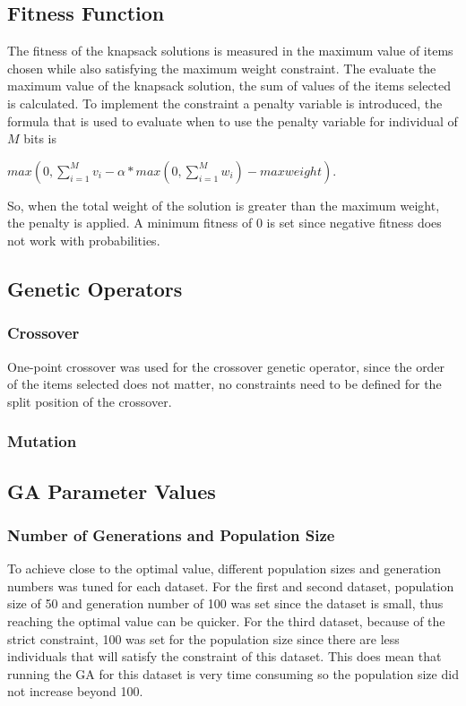 \documentclass{article}
\begin{document}
\subsection*{Fitness Function}
The fitness of the knapsack solutions is measured in the maximum value of items chosen while also satisfying the maximum weight constraint. The evaluate the maximum value of the knapsack solution, the sum of values of the items selected is calculated. To implement the constraint a penalty variable is introduced, the formula that is used to evaluate when to use the penalty variable for individual of $M$ bits is 
\begin{center} 
$max(0, \sum_{i=1}^{M}v_i - \alpha *max(0,\sum_{i=1}^{M}w_i)-max weight)$. 
\end{center}
So, when the total weight of the solution is greater than the maximum weight, the penalty is applied. A minimum fitness of 0 is set since negative fitness does not work with probabilities.
\subsection*{Genetic Operators}
\subsubsection*{Crossover}
One-point crossover was used for the crossover genetic operator, since the order of the items selected does not matter, no constraints need to be defined for the split position of the crossover. 
\subsubsection*{Mutation}
\subsection*{GA Parameter Values}
\subsubsection*{Number of Generations and Population Size}
To achieve close to the optimal value, different population sizes and generation numbers was tuned for each dataset. For the first and second dataset, population size of 50 and generation number of 100 was set since the dataset is small, thus reaching the optimal value can be quicker. For the third dataset, because of the strict constraint, 100 was set for the population size since there are less individuals that will satisfy the constraint of this dataset. This does mean that running the GA for this dataset is very time consuming so the population size did not increase beyond 100.
\end{document}

